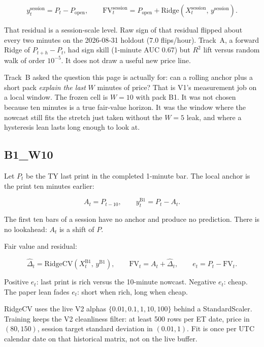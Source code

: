 \documentclass[11pt]{article}
\newcommand{\code}[1]{\texttt{\detokenize{#1}}}
\begin{document}
\begin{equation}
  y^{\mathrm{session}}_t = P_t - P_{\mathrm{open}},
  \qquad
  \mathrm{FV}^{\mathrm{session}}_t
  = P_{\mathrm{open}} + \mathrm{Ridge}(X^{\mathrm{session}}_t,\, y^{\mathrm{session}}).
\end{equation}

That residual is a session-scale level.  Raw sign of that residual
flipped about every two minutes on the 2026-08-31 holdout (7.0
flips/hour).  Track~A, a forward Ridge of \(P_{t+h}-P_t\), had
sign skill (1-minute AUC 0.67) but \(R^2\) lift versus random walk of
order \(10^{-5}\).  It does not draw a useful new price line.

Track~B asked the question this page is actually for: can a rolling
anchor plus a short pack \emph{explain the last} \(W\) minutes of
price?  That is V1's measurement job on a local window.  The frozen
cell is \(W=10\) with pack B1.  It was not chosen because ten
minutes is a true fair-value horizon.  It was the window where the
nowcast still fits the stretch just taken without the \(W=5\)
\code{mom_5m} leak, and where a hysteresis lean lasts long enough
to look at.

\subsection{B1\_W10}

Let \(P_t\) be the TY last print in the completed 1-minute bar.  The
local anchor is the print ten minutes earlier:

\begin{equation}
  A_t = P_{t-10},
  \qquad
  y^{\mathrm{B1}}_t = P_t - A_t.
\end{equation}

The first ten bars of a session have no anchor and produce no
prediction.  There is no lookahead: \(A_t\) is a shift of \(P\).

Fair value and residual:

\begin{equation}
  \widehat{\Delta}_t = \mathrm{RidgeCV}(X^{\mathrm{B1}}_t,\, y^{\mathrm{B1}}),
  \qquad
  \mathrm{FV}_t = A_t + \widehat{\Delta}_t,
  \qquad
  e_t = P_t - \mathrm{FV}_t.
\end{equation}

Positive \(e_t\): last print is rich versus the 10-minute nowcast.
Negative \(e_t\): cheap.  The paper lean fades \(e_t\): short when
rich, long when cheap.

RidgeCV uses the live V2 alphas \(\{0.01, 0.1, 1, 10, 100\}\) behind
a StandardScaler.  Training keeps the V2 cleanliness filter: at least
500 rows per ET date, price in \((80, 150)\), session target
standard deviation in \((0.01, 1)\).  Fit is once per UTC calendar
date on that historical matrix, not on the live buffer.
\end{document}
